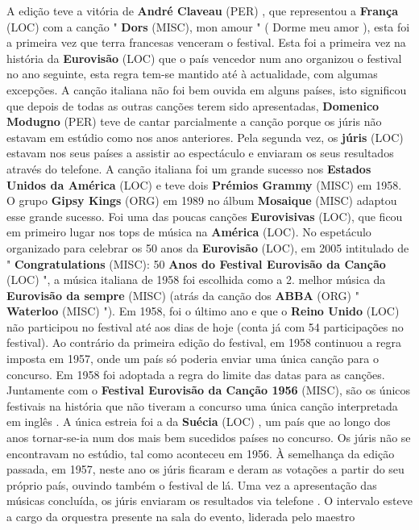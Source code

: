 \documentclass[12pt,a4paper]{article}
\begin{document}
A edição teve a vitória de \textbf{André Claveau} (PER) , que representou a \textbf{França} (LOC) com a canção " \textbf{Dors} (MISC), mon amour " ( Dorme meu amor ), esta foi a primeira vez que terra francesas venceram o festival. Esta foi a primeira vez na história da \textbf{Eurovisão} (LOC) que o país vencedor num ano organizou o festival no ano seguinte, esta regra tem-se mantido até à actualidade, com algumas excepções. A canção italiana não foi bem ouvida em alguns países, isto significou que depois de todas as outras canções terem sido apresentadas, \textbf{Domenico Modugno} (PER) teve de cantar parcialmente a canção porque os júris não estavam em estúdio como nos anos anteriores. Pela segunda vez, os \textbf{júris} (LOC) estavam nos seus países a assistir ao espectáculo e enviaram os seus resultados através do telefone. A canção italiana foi um grande sucesso nos \textbf{Estados Unidos da América} (LOC) e teve dois \textbf{Prémios Grammy} (MISC) em 1958. O grupo \textbf{Gipsy Kings} (ORG) em 1989 no álbum \textbf{Mosaique} (MISC) adaptou esse grande sucesso. Foi uma das poucas canções \textbf{Eurovisivas} (LOC), que ficou em primeiro lugar nos tops de música na \textbf{América} (LOC). No espetáculo organizado para celebrar os 50 anos da \textbf{Eurovisão} (LOC), em 2005 intitulado de " \textbf{Congratulations} (MISC): 50 \textbf{Anos do Festival Eurovisão da Canção} (LOC) ", a música italiana de 1958 foi escolhida como a 2. melhor música da \textbf{Eurovisão da sempre} (MISC) (atrás da canção dos \textbf{ABBA} (ORG) " \textbf{Waterloo} (MISC) "). Em 1958, foi o último ano e que o \textbf{Reino Unido} (LOC) não participou no festival até aos dias de hoje (conta já com 54 participações no festival). Ao contrário da primeira edição do festival, em 1958 continuou a regra imposta em 1957, onde um país só poderia enviar uma única canção para o concurso. Em 1958 foi adoptada a regra do limite das datas para as canções. Juntamente com o \textbf{Festival Eurovisão da Canção 1956} (MISC), são os únicos festivais na história que não tiveram a concurso uma única canção interpretada em inglês . A única estreia foi a da \textbf{Suécia} (LOC) , um país que ao longo dos anos tornar-se-ia num dos mais bem sucedidos países no concurso. Os júris não se encontravam no estúdio, tal como aconteceu em 1956. À semelhança da edição passada, em 1957, neste ano os júris ficaram e deram as votações a partir do seu próprio país, ouvindo também o festival de lá. Uma vez a apresentação das músicas concluída, os júris enviaram os resultados via telefone . O intervalo esteve a cargo da orquestra presente na sala do evento, liderada pelo maestro
\end{document}
